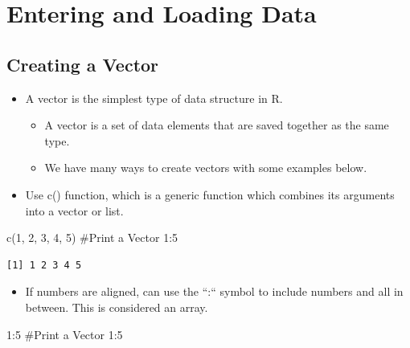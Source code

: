 \documentclass[
  letterpaper,
  DIV=11,
  numbers=noendperiod]{scrreprt}
\newenvironment{Shaded}{\begin{snugshade}}{\end{snugshade}}
\newcommand{\CommentTok}[1]{\textcolor[rgb]{0.37,0.37,0.37}{#1}}
\newcommand{\DecValTok}[1]{\textcolor[rgb]{0.68,0.00,0.00}{#1}}
\newcommand{\FunctionTok}[1]{\textcolor[rgb]{0.28,0.35,0.67}{#1}}
\newcommand{\NormalTok}[1]{\textcolor[rgb]{0.00,0.23,0.31}{#1}}
\newcommand{\SpecialCharTok}[1]{\textcolor[rgb]{0.37,0.37,0.37}{#1}}
\providecommand{\tightlist}{%
  \setlength{\itemsep}{0pt}\setlength{\parskip}{0pt}}\usepackage{longtable,booktabs,array}
\begin{document}

\chapter{Entering and Loading Data}\label{entering-and-loading-data}

\section{Creating a Vector}\label{creating-a-vector}

\begin{itemize}
\tightlist
\item
  A vector is the simplest type of data structure in R.

  \begin{itemize}
  \tightlist
  \item
    A vector is a set of data elements that are saved together as the
    same type.
  \item
    We have many ways to create vectors with some examples below.
  \end{itemize}
\item
  Use c() function, which is a generic function which combines its
  arguments into a vector or list.
\end{itemize}

\begin{Shaded}
\begin{Highlighting}[]
\FunctionTok{c}\NormalTok{(}\DecValTok{1}\NormalTok{, }\DecValTok{2}\NormalTok{, }\DecValTok{3}\NormalTok{, }\DecValTok{4}\NormalTok{, }\DecValTok{5}\NormalTok{)  }\CommentTok{\#Print a Vector 1:5}
\end{Highlighting}
\end{Shaded}

\begin{verbatim}
[1] 1 2 3 4 5
\end{verbatim}

\begin{itemize}
\tightlist
\item
  If numbers are aligned, can use the ``:`` symbol to include numbers
  and all in between. This is considered an array.
\end{itemize}

\begin{Shaded}
\begin{Highlighting}[]
\DecValTok{1}\SpecialCharTok{:}\DecValTok{5}  \CommentTok{\#Print a Vector 1:5}
\end{Highlighting}
\end{Shaded}
\end{document}
